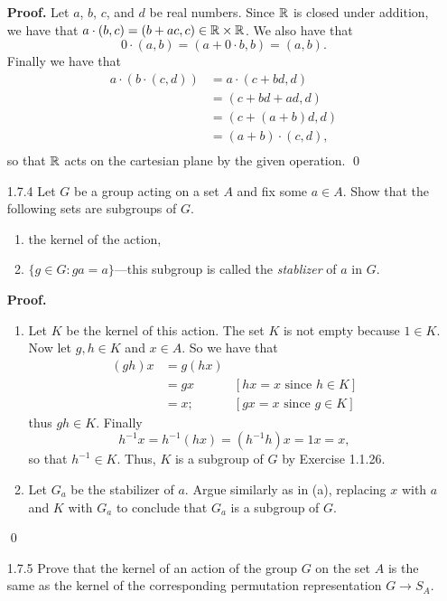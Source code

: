 \begin{enumerate}
      \textbf{Proof.} Let $a$, $b$, $c$, and $d$ be real numbers. Since $\mathbb{R}$ is
      closed under addition, we have that
      $a \cdot (b, c) = (b + ac, c) \in \mathbb{R} \times \mathbb{R}$. We also have that
      $$0 \cdot (a, b) = (a + 0 \cdot b, b) = (a, b).$$
      Finally we have that
      \begin{align*}
         a \cdot (b \cdot (c, d)) &= a \cdot (c + bd, d) \\
            &= (c + bd + ad, d) \\
            &= (c + (a + b)d, d) \\
            &= (a + b) \cdot (c, d), \\
      \end{align*}
      so that $\mathbb{R}$ acts on the cartesian plane by the given operation. \qed
   \item[1.7.4]   Let $G$ be a group acting on a set $A$ and fix some $a \in A$.
                  Show that the following sets are subgroups of $G$.
                  \begin{enumerate}
                     \item the kernel of the action,
                     \item $\{g \in G : ga = a\}$---this subgroup is called the
                           \textit{stablizer} of $a$ in $G$.
                  \end{enumerate}

      \textbf{Proof.}

      \begin{enumerate}
         \item Let $K$ be the kernel of this action. The set $K$ is not empty
               because $1 \in K$. Now let $g, h \in K$ and $x \in A$. So we
               have that
               \begin{align*}
                  (gh)x &= g(hx) \\
                     &= gx &[hx = x \text{ since } h \in K] \\
                     &= x; &[gx = x \text{ since } g \in K]
               \end{align*}
               thus $gh \in K$. Finally
               $$h^{-1}x = h^{-1}(hx) = (h^{-1}h)x = 1x = x,$$
               so that $h^{-1} \in K$. Thus, $K$ is a subgroup of $G$ by
               Exercise 1.1.26.

         \item Let $G_a$ be the stabilizer of $a$. Argue similarly as in (a),
               replacing $x$ with $a$ and $K$ with $G_a$ to conclude that $G_a$ 
               is a subgroup of $G$.
      \end{enumerate}  \qed
   \item[1.7.5]   Prove that the kernel of an action of the group $G$ on the set
                  $A$ is the same as the kernel of the corresponding permutation
                  representation $G \rightarrow S_A$.


\end{enumerate}
